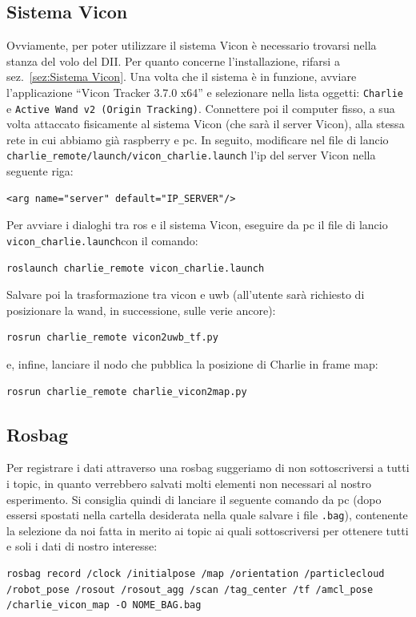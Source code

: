 \subsection{Sistema Vicon}
Ovviamente, per poter utilizzare il sistema Vicon è necessario trovarsi nella stanza del volo del DII. 
Per quanto concerne l'installazione, rifarsi a sez.~\ref{sez:Sistema Vicon}. 
Una volta che il sistema è in funzione, avviare l'applicazione ``Vicon Tracker 3.7.0 x64'' e selezionare nella lista oggetti: \texttt{Charlie} e 
\texttt{Active Wand v2 (Origin Tracking)}. 
Connettere poi il computer fisso, a sua volta attaccato fisicamente al sistema Vicon (che sarà il server Vicon), alla stessa rete in cui abbiamo già
raspberry e pc. In seguito, modificare nel file di lancio \texttt{charlie\_remote/launch/vicon\_charlie.launch} l'ip del server Vicon nella seguente riga:
\begin{lstlisting}[style=xml, firstnumber=6]
	<arg name="server" default="IP_SERVER"/>
\end{lstlisting}

Per avviare i dialoghi tra ros e il sistema Vicon, eseguire da pc il file di lancio \verb|vicon_charlie.launch|con il comando:
\begin{lstlisting}[style=bashPC]
	roslaunch charlie_remote vicon_charlie.launch
\end{lstlisting}

Salvare poi la trasformazione tra vicon e uwb (all'utente sarà richiesto di posizionare la wand, in successione, sulle verie ancore):
\begin{lstlisting}[style=bashPC]
	rosrun charlie_remote vicon2uwb_tf.py
\end{lstlisting}

e, infine, lanciare il nodo che pubblica la posizione di Charlie in frame map:
\begin{lstlisting}[style=bashPC]
	rosrun charlie_remote charlie_vicon2map.py
\end{lstlisting}


\subsection{Rosbag}
Per registrare i dati attraverso una rosbag suggeriamo di non sottoscriversi a tutti i topic, in quanto verrebbero salvati molti elementi non necessari 
al nostro esperimento. Si consiglia quindi di lanciare il seguente comando da pc (dopo essersi spostati nella cartella desiderata nella quale salvare i 
file \verb|.bag|), contenente la selezione da noi fatta in merito ai topic ai quali sottoscriversi per ottenere tutti e soli i dati di nostro interesse:
\begin{lstlisting}[style=bashPC]
	rosbag record /clock /initialpose /map /orientation /particlecloud /robot_pose /rosout /rosout_agg /scan /tag_center /tf /amcl_pose /charlie_vicon_map -O NOME_BAG.bag
\end{lstlisting}

